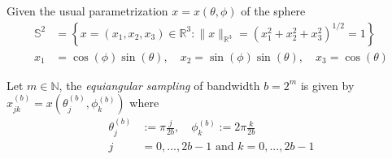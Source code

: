 Given the usual parametrization $x = x(\theta, \phi)$ of the sphere
\begin{align*}
	\mathbb{S}^{2}&=\left\{x=\left(x_{1}, x_{2}, x_{3}\right) \in \mathbb{R}^{3} :\|x\|_{\mathbb{R}^{3}}=\left(x_{1}^{2}+x_{2}^{2}+x_{3}^{2}\right)^{1 / 2}=1\right\}\\
	x_{1}&=\cos (\phi) \sin (\theta), \quad x_{2}=\sin (\phi) \sin (\theta), \quad x_{3}=\cos (\theta)
\end{align*}

Let $m\in\mathbb N$, the \textit{equiangular sampling} of bandwidth $b=2^m$ is given by 
$
x_{j k}^{(b)}=x\left(\theta_{j}^{(b)}, \phi_{k}^{(b)}\right)
$
where
\begin{align*}
	\theta_{j}^{(b)} &:=\pi \frac{j}{2 b}, \quad \phi_{k}^{(b)} :=2 \pi \frac{k}{2 b}\\
	j&=0, ..., 2b-1 \text{ and }k=0, ..., 2b-1 
\end{align*}

